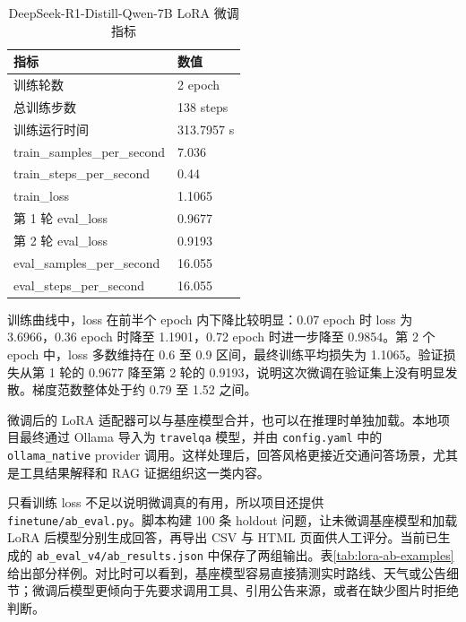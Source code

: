 \documentclass[bwprint]{report}
\begin{document}
\begin{table}[H]
    \caption{DeepSeek-R1-Distill-Qwen-7B LoRA 微调指标}
    \label{tab:lora-training-metrics}
    \centering
    \begin{tabular}{p{}p{}}
        \toprule[1.5pt]
        指标 & 数值 \\
        \midrule[1pt]
        训练轮数 & 2 epoch \\
        总训练步数 & 138 steps \\
        训练运行时间 & 313.7957 s \\
        train\_samples\_per\_second & 7.036 \\
        train\_steps\_per\_second & 0.44 \\
        train\_loss & 1.1065 \\
        第 1 轮 eval\_loss & 0.9677 \\
        第 2 轮 eval\_loss & 0.9193 \\
        eval\_samples\_per\_second & 16.055 \\
        eval\_steps\_per\_second & 16.055 \\
        \bottomrule[1.5pt]
    \end{tabular}
\end{table}

训练曲线中，loss 在前半个 epoch 内下降比较明显：0.07 epoch 时 loss 为 3.6966，0.36 epoch 时降至 1.1901，0.72 epoch 时进一步降至 0.9854。第 2 个 epoch 中，loss 多数维持在 0.6 至 0.9 区间，最终训练平均损失为 1.1065。验证损失从第 1 轮的 0.9677 降至第 2 轮的 0.9193，说明这次微调在验证集上没有明显发散。梯度范数整体处于约 0.79 至 1.52 之间。

微调后的 LoRA 适配器可以与基座模型合并，也可以在推理时单独加载。本地项目最终通过 Ollama 导入为 \texttt{travelqa} 模型，并由 \texttt{config.yaml} 中的 \texttt{ollama\_native} provider 调用。这样处理后，回答风格更接近交通问答场景，尤其是工具结果解释和 RAG 证据组织这一类内容。

只看训练 loss 不足以说明微调真的有用，所以项目还提供 \texttt{finetune/ab\_eval.py}。脚本构建 100 条 holdout 问题，让未微调基座模型和加载 LoRA 后模型分别生成回答，再导出 CSV 与 HTML 页面供人工评分。当前已生成的 \texttt{ab\_eval\_v4/ab\_results.json} 中保存了两组输出。表\ref{tab:lora-ab-examples} 给出部分样例。对比时可以看到，基座模型容易直接猜测实时路线、天气或公告细节；微调后模型更倾向于先要求调用工具、引用公告来源，或者在缺少图片时拒绝判断。
\end{document}
